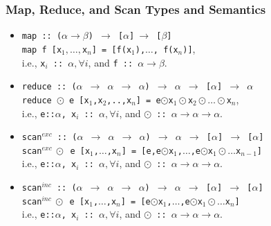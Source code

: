 \documentclass{beamer}
\renewcommand{\emph}[1]{\textcolor{structure}{#1}}
\newcommand{\emp}[1]{\textcolor{DikuRed}{ #1}}
\begin{document}
\begin{frame}[fragile,t]
  \frametitle{Map, Reduce, and Scan Types and Semantics}

\begin{itemize}
    \item \emp{\tt map~::~($\alpha\rightarrow\beta$)~$\rightarrow$~[$\alpha$]$~\rightarrow$~[$\beta$]}\\
    \emph{\tt map f [x$_1,\ldots, $x$_n$] = [f(x$_1$),$\ldots$, f(x$_n$)]},\\  
        i.e., \emp{\tt{}x$_i$~::~$\alpha, \forall i$}, and 
        \emp{\tt f~::~$\alpha\rightarrow\beta$}.\medskip

    \item \emp{{\tt reduce~::~($\alpha$~$\rightarrow$~$\alpha$~$\rightarrow$~$\alpha$)~$\rightarrow$~$\alpha$~$\rightarrow$~[$\alpha$]~$\rightarrow$~$\alpha$}}\\
        \emph{\tt reduce $\odot$~e~[x$_1$,x$_2$,..,x$_n$]~=~e$\odot$x$_1\odot$x$_2\odot\ldots\odot$x$_n$},\\
        i.e., \emp{{\tt{}e::$\alpha$, x$_i$~::~$\alpha, \forall i$}}, and 
        \emp{\tt $\odot$~::~$\alpha\rightarrow\alpha\rightarrow\alpha$}.\medskip

    \item \emp{{\tt scan$^{exc}$~::~($\alpha$~$\rightarrow$~$\alpha$~$\rightarrow$~$\alpha$)~$\rightarrow$~$\alpha$~$\rightarrow$~[$\alpha$]~$\rightarrow$~[$\alpha$]}}\\
        \emph{\tt scan$^{exc}~\odot$~e~[x$_1$,$\ldots$,x$_n$]~=~[e,e$\odot$x$_1$,$\ldots$,e$\odot$x$_1\odot\ldots$x$_{n-1}$]}\\
        i.e., \emp{{\tt{}e::$\alpha$, x$_i$~::~$\alpha, \forall i$}}, and 
        \emp{\tt $\odot$~::~$\alpha\rightarrow\alpha\rightarrow\alpha$}.\medskip

    \item \emp{{\tt scan$^{inc}$~::~($\alpha$~$\rightarrow$~$\alpha$~$\rightarrow$~$\alpha$)~$\rightarrow$~$\alpha$~$\rightarrow$~[$\alpha$]~$\rightarrow$~[$\alpha$]}}\\
        \emph{\tt scan$^{inc}~\odot$~e~[x$_1$,$\ldots$,x$_n$]~=~[e$\odot$x$_1$,$\ldots$,e$\odot$x$_1\odot\ldots$x$_{n}$]}\\
        i.e., \emp{{\tt{}e::$\alpha$, x$_i$~::~$\alpha, \forall i$}}, and 
        \emp{\tt $\odot$~::~$\alpha\rightarrow\alpha\rightarrow\alpha$}.

\end{itemize}

\end{frame}
\end{document}
